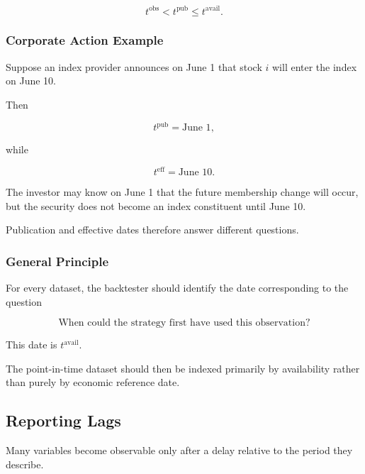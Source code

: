 \documentclass[11pt,a4paper]{article}
\begin{document}
\begin{equation}
\boxed{
t^{\mathrm{obs}}
<
t^{\mathrm{pub}}
\leq
t^{\mathrm{avail}}.
}
\end{equation}


\subsubsection{Corporate Action Example}

Suppose an index provider announces on June 1 that stock $i$ will enter the
index on June 10.

Then

\begin{equation}
t^{\mathrm{pub}}
=
\text{June 1},
\end{equation}

while

\begin{equation}
t^{\mathrm{eff}}
=
\text{June 10}.
\end{equation}

The investor may know on June 1 that the future membership change will occur,
but the security does not become an index constituent until June 10.

Publication and effective dates therefore answer different questions.


\subsubsection{General Principle}

For every dataset, the backtester should identify the date corresponding to the
question

\begin{equation}
\boxed{
\text{When could the strategy first have used this observation?}
}
\end{equation}

This date is $t^{\mathrm{avail}}$.

The point-in-time dataset should then be indexed primarily by availability
rather than purely by economic reference date.


\subsection{Reporting Lags}
\label{subsec:reporting_lags}

Many variables become observable only after a delay relative to the period they
describe.
\end{document}
